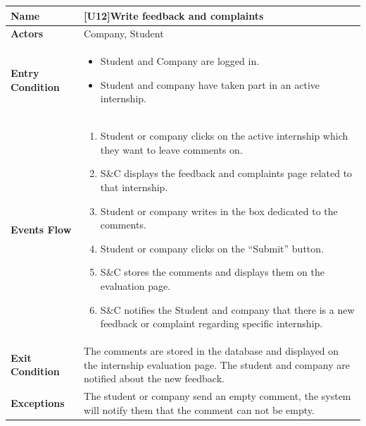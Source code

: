 \begin{center}
    \begin{tabular}{|p{9em}|p{27em}|}
        \hline
        \rowcolor{bluepoli!40} %
        \textbf{Name} & \textbf{[U12]Write feedback and complaints} \\
        \hline
        \textbf{Actors} & Company, Student\\
        \hline
        \textbf{Entry Condition} & 
        \begin{itemize}
            \item Student and Company are logged in.
            \item Student and company have taken part in an active internship.
        \end{itemize} \\
        \hline
        \textbf{Events Flow} & 
        \begin{enumerate}
            \item Student or company clicks on the active internship which they want to leave comments on.
            \item S\&C displays the feedback and complaints page related to that internship.
            \item Student or company writes in the box dedicated to the comments.
            \item Student or company clicks on the ``Submit'' button.
            \item S\&C stores the comments and displays them on the evaluation page.
            \item S\&C notifies the Student and company that there is a new feedback or complaint regarding specific internship.
        \end{enumerate} \\
        \hline
        \textbf{Exit Condition} & 
         The comments are stored in the database and displayed on the internship evaluation page. 
         The student and company are notified about the new feedback.\\
        \hline
        \textbf{Exceptions} &
        The student or company send an empty comment, the system will notify them that the comment can not be empty.\\
        \hline
    \end{tabular}
\end{center}

